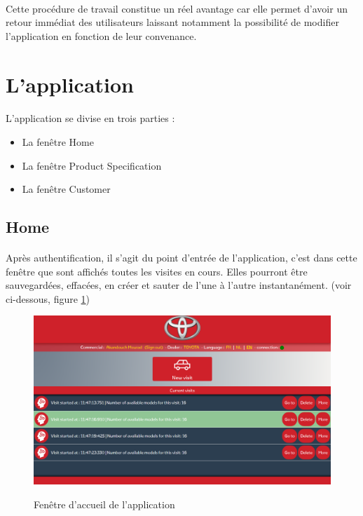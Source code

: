 \documentclass[12pt]{report}
\begin{document}
\paragraph{}
Cette procédure de travail constitue un réel avantage car elle permet d’avoir un retour immédiat des utilisateurs  laissant notamment la possibilité de modifier l’application en fonction de leur convenance. 

\section{L'application}
\paragraph{}
L'application se divise en trois parties :

\begin{itemize}
\item La fenêtre Home
\item La fenêtre Product Specification
\item La fenêtre Customer
\end{itemize}

\subsection*{Home}
\paragraph{}
Après authentification, il s'agit du point d'entrée de l'application, c'est dans cette fenêtre que sont affichés toutes les visites en cours. Elles pourront être sauvegardées, effacées, en créer et sauter de l'une à l'autre instantanément.
(voir ci-dessous, figure \ref{image_home})

\begin{figure}[H]
	\caption{Fenêtre d'accueil de l'application}
	\includegraphics[width=\linewidth]{img/image_home}
	\label{image_home}
\end{figure}
\end{document}
